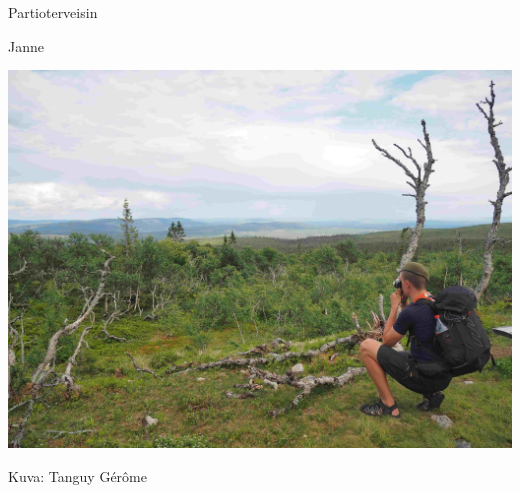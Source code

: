 \begin{multicols}{2}
\vspace*{.16cm}
\noindent\null\hfill Partioterveisin

\noindent\null\hfill Janne

\medskip

\vspace*{.32cm}
\noindent\includegraphics[width=\linewidth,trim={0 1.5cm 0 4cm},clip]{assets/lpkjtervehdys}

\medskip

\noindent\null\hfill Kuva: Tanguy Gérôme
\end{multicols}
